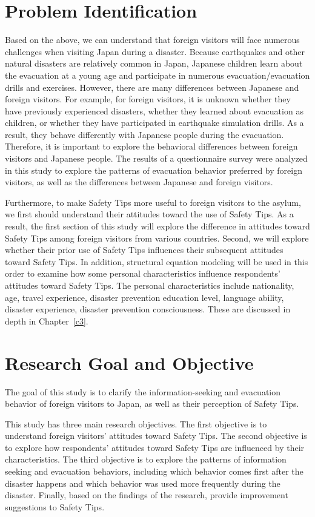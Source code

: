 \section{Problem Identification}
Based on the above, we can understand that foreign visitors will face numerous challenges when visiting Japan during a disaster. Because earthquakes and other natural disasters are relatively common in Japan, Japanese children learn about the evacuation at a young age and participate in numerous evacuation/evacuation drills and exercises. However, there are many differences between Japanese and foreign visitors. For example, for foreign visitors, it is unknown whether they have previously experienced disasters, whether they learned about evacuation as children, or whether they have participated in earthquake simulation drills. As a result, they behave differently with Japanese people during the evacuation. Therefore, it is important to explore the behavioral differences between foreign visitors and Japanese people. The results of a questionnaire survey were analyzed in this study to explore the patterns of evacuation behavior preferred by foreign visitors, as well as the differences between Japanese and foreign visitors.

Furthermore, to make Safety Tips more useful to foreign visitors to the asylum, we first should understand their attitudes toward the use of Safety Tips. As a result, the first section of this study will explore the difference in attitudes toward Safety Tips among foreign visitors from various countries. Second, we will explore whether their prior use of Safety Tips influences their subsequent attitudes toward Safety Tips. In addition, structural equation modeling will be used in this order to examine how some personal characteristics influence respondents' attitudes toward Safety Tips. The personal characteristics include nationality, age, travel experience, disaster prevention education level, language ability, disaster experience, disaster prevention consciousness. These are discussed in depth in Chapter~\ref{c3}.

\section{Research Goal and Objective}
The goal of this study is to clarify the information-seeking and evacuation behavior of foreign visitors to Japan, as well as their perception of Safety Tips. 

This study has three main research objectives. The first objective is to understand foreign visitors' attitudes toward Safety Tips. The second objective is to explore how respondents' attitudes toward Safety Tips are influenced by their characteristics. The third objective is to explore the patterns of information seeking and evacuation behaviors, including which behavior comes first after the disaster happens and which behavior was used more frequently during the disaster. Finally, based on the findings of the research, provide improvement suggestions to Safety Tips.


